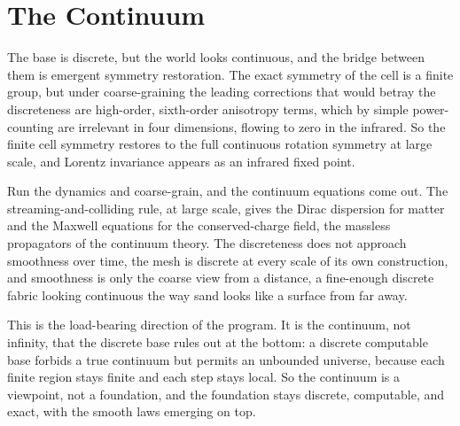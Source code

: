 \section{The Continuum}

The base is discrete, but the world looks continuous, and the bridge between them is emergent symmetry restoration. The
exact symmetry of the cell is a finite group, but under coarse-graining the leading corrections that would betray the
discreteness are high-order, sixth-order anisotropy terms, which by simple power-counting are irrelevant in four
dimensions, flowing to zero in the infrared. So the finite cell symmetry restores to the full continuous rotation
symmetry at large scale, and Lorentz invariance appears as an infrared fixed point.

Run the dynamics and coarse-grain, and the continuum equations come out. The streaming-and-colliding rule, at large
scale, gives the Dirac dispersion for matter and the Maxwell equations for the conserved-charge field, the massless
propagators of the continuum theory. The discreteness does not approach smoothness over time, the mesh is discrete at
every scale of its own construction, and smoothness is only the coarse view from a distance, a fine-enough discrete
fabric looking continuous the way sand looks like a surface from far away.

This is the load-bearing direction of the program. It is the continuum, not infinity, that the discrete base rules out at
the bottom: a discrete computable base forbids a true continuum but permits an unbounded universe, because each finite
region stays finite and each step stays local. So the continuum is a viewpoint, not a foundation, and the foundation
stays discrete, computable, and exact, with the smooth laws emerging on top.
